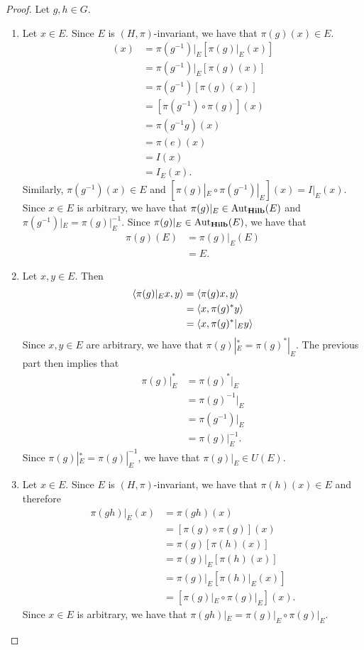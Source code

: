 \documentclass{book}
\begin{document}
	\begin{proof}
		Let $g,h \in G$. 
		\begin{enumerate}
			\item Let $x \in E$. Since $E$ is $(H, \pi)$-invariant, we have that $\pi(g)(x) \in E$. 
			\begin{align*}
				[\pi(g^{-1})|_E \circ \pi(g)|_E](x) 
				& = \pi(g^{-1})|_E [\pi(g)|_E(x)] \\
				& = \pi(g^{-1})|_E [\pi(g)(x)] \\
				& = \pi(g^{-1}) [\pi(g)(x) ] \\
				& = [\pi(g^{-1}) \circ \pi(g)](x)  \\
				& = \pi(g^{-1} g)(x) \\
				& = \pi(e)(x) \\
				& = I(x) \\
				& = I_E(x).
			\end{align*}
			Similarly, $\pi(g^{-1})(x) \in E$ and $[\pi(g)|_E \circ \pi(g^{-1})|_E](x) = I|_E(x)$. Since $x \in E$ is arbitrary, we have that $\pi(g)|_E \in \operatorname{Aut}_{\operatorname*{\text{\textbf{Hilb}}}}(E)$ and $\pi(g^{-1})|_E = \pi(g)|_E^{-1}$. Since $\pi(g)|_E \in \operatorname{Aut}_{\operatorname*{\text{\textbf{Hilb}}}}(E)$, we have that
			\begin{align*}
				\pi(g)(E)
				& = \pi(g)|_E(E) \\
				& = E.
			\end{align*}
			\item Let $x, y \in E$. Then 
			\begin{align*}
				\langle \pi(g)|_E x, y \rangle
				& = \langle \pi(g) x, y \rangle \\
				& = \langle x, \pi(g)^* y \rangle \\
				& = \langle x, \pi(g)^*|_E y \rangle \\
			\end{align*}
			Since $x, y \in E$ are arbitrary, we have that $\pi(g)|_E^* = \pi(g)^*|_E$. The previous part then implies that 
			\begin{align*}
				\pi(g)|_E^* 
				& = \pi(g)^*|_E \\
				& = \pi(g)^{-1}|_E \\
				& = \pi(g^{-1})|_E \\
				& = \pi(g)|_E^{-1}.
			\end{align*}
			Since $\pi(g)|_E^* =  \pi(g)|_E^{-1}$, we have that $\pi(g)|_E \in U(E)$.
			\item Let $x \in E$. Since $E$ is $(H, \pi)$-invariant, we have that $\pi(h)(x) \in E$ and therefore 
			\begin{align*}
				\pi(g h)|_E(x)
				& = \pi(g h)(x) \\
				& = [\pi(g) \circ \pi(g)](x) \\
				& = \pi(g) [\pi(h)(x)] \\
				& = \pi(g)|_E [\pi(h)(x)] \\
				& = \pi(g)|_E [\pi(h)|_E(x)] \\
				& = [\pi(g)|_E \circ \pi(g)|_E](x).
			\end{align*}
			Since $x \in E$ is arbitrary, we have that $\pi(g h)|_E = \pi(g)|_E \circ \pi(g)|_E$.
		\end{enumerate}
	\end{proof}
\end{document}
